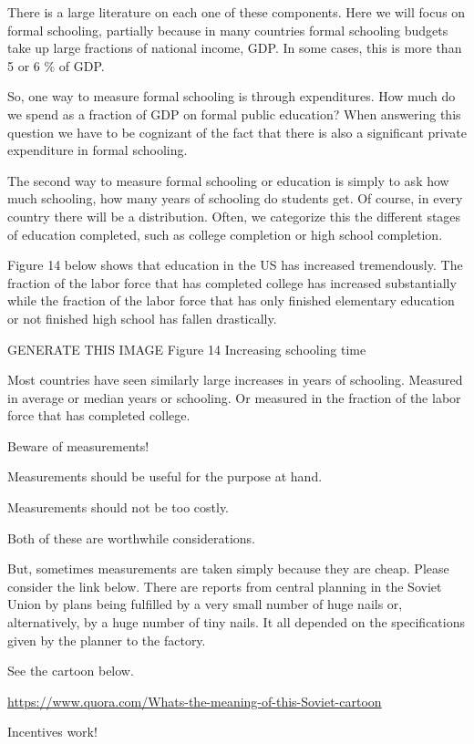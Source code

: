 \documentclass[
]{book}
\begin{document}
There is a large literature on each one of these components. Here we will focus on formal schooling, partially because in many countries formal schooling budgets take up large fractions of national income, GDP. In some cases, this is more than 5 or 6 \% of GDP.

So, one way to measure formal schooling is through expenditures. How much do we spend as a fraction of GDP on formal public education? When answering this question we have to be cognizant of the fact that there is also a significant private expenditure in formal schooling.

The second way to measure formal schooling or education is simply to ask how much schooling, how many years of schooling do students get. Of course, in every country there will be a distribution. Often, we categorize this the different stages of education completed, such as college completion or high school completion.

Figure 14 below shows that education in the US has increased tremendously. The fraction of the labor force that has completed college has increased substantially while the fraction of the labor force that has only finished elementary education or not finished high school has fallen drastically.

GENERATE THIS IMAGE
Figure 14 Increasing schooling time

Most countries have seen similarly large increases in years of schooling. Measured in average or median years or schooling. Or measured in the fraction of the labor force that has completed college.

Beware of measurements!

Measurements should be useful for the purpose at hand.

Measurements should not be too costly.

Both of these are worthwhile considerations.

But, sometimes measurements are taken simply because they are cheap. Please consider the link below. There are reports from central planning in the Soviet Union by plans being fulfilled by a very small number of huge nails or, alternatively, by a huge number of tiny nails. It all depended on the specifications given by the planner to the factory.

See the cartoon below.

\url{https://www.quora.com/Whats-the-meaning-of-this-Soviet-cartoon}

Incentives work!
\end{document}
